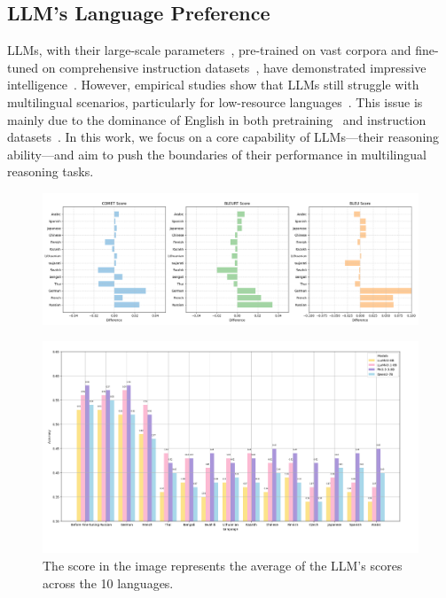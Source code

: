 \documentclass[11pt]{article}
\begin{document}
\subsection{LLM's Language Preference}
LLMs, with their large-scale parameters~\citep{aki1967scaling,huo2009scaling,wang2006scaling,rosenfeld1999quasi}, pre-trained on vast corpora and fine-tuned on comprehensive instruction datasets~\citep{huang2016well,zhao2020ape210k,lindstrom2022clevr,koncel2016mawps}, have demonstrated impressive intelligence~\citep{touvron2023llama,floridi2020gpt,kalyan2023survey,lagler2013gpt2}. However, empirical studies show that LLMs still struggle with multilingual scenarios, particularly for low-resource languages~\citep{shi2022languagemodelsmultilingualchainofthought, zhu2024question,weyssow2024codeultrafeedback}. This issue is mainly due to the dominance of English in both pretraining~\citep{blevins2022languagecontaminationhelpsexplain} and instruction datasets~\citep{wang2023farcamelsgoexploring}. In this work, we focus on a core capability of LLMs—their reasoning ability—and aim to push the boundaries of their performance in multilingual reasoning tasks.


\begin{figure}[h]
\begin{center}
\includegraphics[width=1\linewidth]{picture/figure_1_diff.png}
\end{center}
\caption{}
\end{figure}

\begin{figure}[h]
\begin{center}
\includegraphics[width=1\linewidth]{picture/figure_2.png}
\end{center}
\caption{The score in the image represents the average of the LLM's scores across the 10 languages.}
\end{figure}
\end{document}
